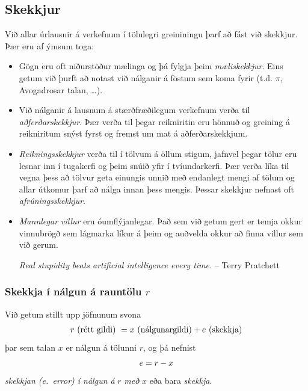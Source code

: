 \documentclass[a4paper,10pt,icelandic]{sphinxmanual}
\begin{document}
\subsection{Skekkjur}
\label{kafli01:index-4}\label{kafli01:skekkjur}
Við allar úrlausnir á verkefnum í tölulegri greininingu þarf að fást við
skekkjur. Þær eru af ýmsum toga:
\begin{itemize}
\item {} 
Gögn eru oft niðurstöður mælinga og þá fylgja þeim \emph{mæliskekkjur}.
Eins getum við þurft að notast við nálganir á föstum sem koma fyrir
(t.d. \(\pi\), Avogadrosar talan, …).

\item {} 
Við nálganir á lausnum á stærðfræðilegum verkefnum verða til
\emph{aðferðarskekkjur}. Þær verða til þegar reikniritin eru hönnuð og
greining á reikniritum snýst fyrst og fremst um mat á
aðferðarskekkjum.

\item {} 
\emph{Reikningsskekkjur} verða til í tölvum á öllum stigum, jafnvel þegar
tölur eru lesnar inn í tugakerfi og þeim snúið yfir í tvíundarkerfi.
Þær verða líka til vegna þess að tölvur geta einungis unnið með
endanlegt mengi af tölum og allar útkomur þarf að nálga innan þess
mengis. Þessar skekkjur nefnast oft \emph{afrúningsskekkjur}.

\item {} 
\emph{Mannlegar villur} eru óumflýjanlegar. Það sem við getum gert er
temja okkur vinnubrögð sem lágmarka líkur á þeim og auðvelda okkur að
finna villur sem við gerum.

\emph{Real stupidity beats artificial intelligence every time.}
-- Terry Pratchett

\end{itemize}


\subsubsection{Skekkja í nálgun á rauntölu \(r\)}
\label{kafli01:skekkja-i-nalgun-a-rauntolu}\label{kafli01:index-5}
Við getum stillt upp jöfnunum svona
\begin{gather}
\begin{split}r \text{ (rétt gildi) } = x\text{ (nálgunargildi)} +
    e \text{ (skekkja)}\end{split}\notag
\end{gather}
þar sem talan \(x\) er nálgun á tölunni \(r\), og þá nefnist
\begin{gather}
\begin{split}e=r-x\end{split}\notag
\end{gather}
\emph{skekkjan (e. error) í nálgun á} \(r\) \emph{með} \(x\) eða bara
\emph{skekkja}.
\end{document}
